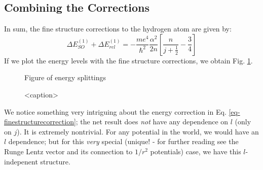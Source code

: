 \subsection{Combining the Corrections}
In sum, the fine structure corrections to the hydrogen atom are given by:
\begin{equation}\label{eq-finestructurecorrection}
    \Delta E_{SO}^{(1)} + \Delta E_{rel}^{(1)} = -\frac{me^4}{\hbar^2}\frac{\alpha^2}{2n}\left[\frac{n}{j+\frac{1}{2}} - \frac{3}{4}\right]
\end{equation}
If we plot the energy levels with the fine structure corrections, we obtain Fig. \ref{fig-finestructuresplit}.

\begin{figure}[htbp]
    \centering
    Figure of energy splittings
    \caption{<caption>}
    \label{fig-finestructuresplit}
\end{figure}

We notice something very intriguing about the energy correction in Eq. \eqref{eq-finestructurecorrection}; the net result does \emph{not} have any dependence on $l$ (only on $j$). It is extremely nontrivial. For any potential in the world, we would have an $l$ dependence; but for this \emph{very} special (unique! - for further reading see the Runge Lentz vector and its connection to $1/r^2$ potentials) case, we have this $l$-indepenent structure. 